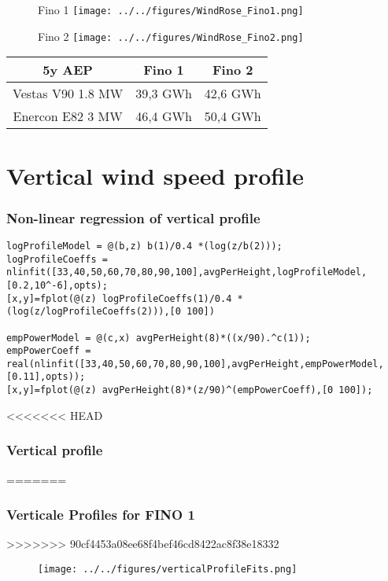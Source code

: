 \documentclass[12pt,t]{beamer}
\begin{document}
\begin{frame}
\begin{figure}[htbp]
	\begin{center}
		\begin{minipage}[t]{0.45\linewidth}
			\centering
			Fino 1
			\texttt{[image: ../../figures/WindRose\_Fino1.png]}
			
			
		\end{minipage}
		\begin{minipage}[t]{0.45\linewidth}
			\centering
			Fino 2
			\texttt{[image: ../../figures/WindRose\_Fino2.png]}

		\end{minipage}
	\end{center}
\end{figure}
\begin{tabular}{c| c| c}
			5y AEP 	& Fino 1 & Fino 2 \\ 
				\hline
			Vestas V90 1.8 MW & 39,3 GWh & 42,6 GWh \\
			\hline
			Enercon E82 3 MW& 46,4 GWh & 50,4 GWh \\
			\end{tabular}
\end{frame}


\section{Vertical wind speed profile}

\begin{frame}[fragile]
\frametitle{Non-linear regression of vertical profile}
\vspace{40 pt}
\begin{lstlisting}
logProfileModel = @(b,z) b(1)/0.4 *(log(z/b(2)));
logProfileCoeffs = nlinfit([33,40,50,60,70,80,90,100],avgPerHeight,logProfileModel,[0.2,10^-6],opts);
[x,y]=fplot(@(z) logProfileCoeffs(1)/0.4 *(log(z/logProfileCoeffs(2))),[0 100])

empPowerModel = @(c,x) avgPerHeight(8)*((x/90).^c(1));
empPowerCoeff = real(nlinfit([33,40,50,60,70,80,90,100],avgPerHeight,empPowerModel,[0.11],opts));
[x,y]=fplot(@(z) avgPerHeight(8)*(z/90)^(empPowerCoeff),[0 100]);
\end{lstlisting}
\end{frame}

\begin{frame}[fragile]
<<<<<<< HEAD
\frametitle{Vertical profile}
=======
\frametitle{Verticale Profiles for FINO 1}
>>>>>>> 90cf4453a08ee68f4bef46cd8422ac8f38e18332
\begin{figure}[H]
\centering
\texttt{[image: ../../figures/verticalProfileFits.png]}
\label{fig:weatherpattern}
\end{figure}
\end{frame}
\end{document}

